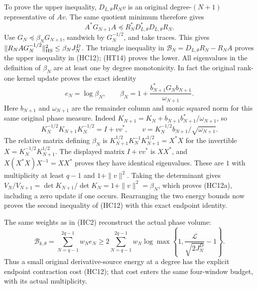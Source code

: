 To prove the upper inequality, $D_{L,\theta}R_Nv$ is an original
degree-$(N+1)$ representative of $Av$.  The same quotient minimum
therefore gives
\[
 A^*G_{N+1}A\preceq R_N^*D_{L,\theta}^*D_{L,\theta}R_N.
\]
Use $G_N\preceq\beta_NG_{N+1}$, sandwich by $G_N^{-1/2}$, and take
traces.  This gives
$\|R_NAG_N^{-1/2}\|_{\rm HS}^2\leq\beta_NJ_N^D$.
The triangle inequality in $\mathscr B_N=D_{L,\theta}R_N-R_NA$
proves the upper inequality in (HC12); (HT14) proves the lower.
All eigenvalues in the definition of $\beta_N$ are at least one by
degree monotonicity.  In fact the original rank-one kernel update proves
the exact identity
\[
 e_N=\log\beta_N,\qquad
 \beta_N=1+\frac{b_{N+1}^*G_Nb_{N+1}}{\omega_{N+1}}.
 \tag{HC12a}
\]
Here $b_{N+1}$ and $\omega_{N+1}$ are the remainder column and monic
squared norm for this same original phase measure.  Indeed
$K_{N+1}=K_N+b_{N+1}b_{N+1}^*/\omega_{N+1}$, so
\[
 K_N^{-1/2}K_{N+1}K_N^{-1/2}=I+vv^*,\qquad
 v=K_N^{-1/2}b_{N+1}/\sqrt{\omega_{N+1}}.
\]
The relative matrix defining $\beta_N$ is
$K_{N+1}^{1/2}K_N^{-1}K_{N+1}^{1/2}=X^*X$ for the invertible
$X=K_N^{-1/2}K_{N+1}^{1/2}$.  The displayed matrix $I+vv^*$ is
$XX^*$, and $X(X^*X)X^{-1}=XX^*$ proves they have identical eigenvalues.
These are $1$ with multiplicity at least $q-1$ and $1+\|v\|^2$.
Taking the determinant gives
$V_N/V_{N+1}=\det K_{N+1}/\det K_N=1+\|v\|^2=\beta_N$,
which proves (HC12a), including a zero update if one occurs.
Rearranging the two energy bounds now proves the second inequality
of (HC12) with this exact endpoint identity.

The same weights as in (HC2) reconstruct the actual phase volume:
\[
 \boxed{
 \mathcal B_{k,\theta}=\sum_{N=q-1}^{2q-1}w_N e_N
 \geq2\sum_{N=q-1}^{2q-1}w_N
 \log\max\left\{1,\frac{\mathcal L}{\sqrt{2J_N^D}}-1\right\}.}
 \tag{HC13}
\]
Thus a small original derivative-source energy at a degree has the
explicit endpoint contraction cost (HC12); that cost enters the same
four-window budget, with its actual multiplicity.

